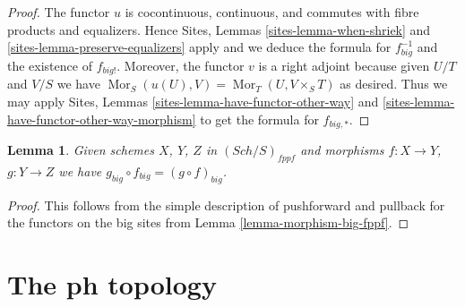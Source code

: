 \documentclass{stacks-project}
\theoremstyle{plain}
\newtheorem{lemma}[subsection]{Lemma}
\theoremstyle{definition}
\theoremstyle{remark}
\numberwithin{equation}{subsection}
\def\Sch{\mathit{Sch}}
\def\Mor{\mathop{\mathrm{Mor}}\nolimits}
\begin{document}
\begin{proof}
The functor $u$ is cocontinuous, continuous, and commutes with fibre products
and equalizers. Hence
Sites, Lemmas \ref{sites-lemma-when-shriek} and
\ref{sites-lemma-preserve-equalizers}
apply and we deduce the formula
for $f_{big}^{-1}$ and the existence of $f_{big!}$. Moreover,
the functor $v$ is a right adjoint because given $U/T$ and $V/S$
we have $\Mor_S(u(U), V) = \Mor_T(U, V \times_S T)$
as desired. Thus we may apply
Sites, Lemmas \ref{sites-lemma-have-functor-other-way} and
\ref{sites-lemma-have-functor-other-way-morphism} to get the
formula for $f_{big, *}$.
\end{proof}

\begin{lemma}
\label{lemma-composition-fppf}
Given schemes $X$, $Y$, $Z$ in $(\Sch/S)_{fppf}$
and morphisms $f : X \to Y$, $g : Y \to Z$ we have
$g_{big} \circ f_{big} = (g \circ f)_{big}$.
\end{lemma}

\begin{proof}
This follows from the simple description of pushforward
and pullback for the functors on the big sites from
Lemma \ref{lemma-morphism-big-fppf}.
\end{proof}



















































\section{The ph topology}
\label{section-ph}
\end{document}
